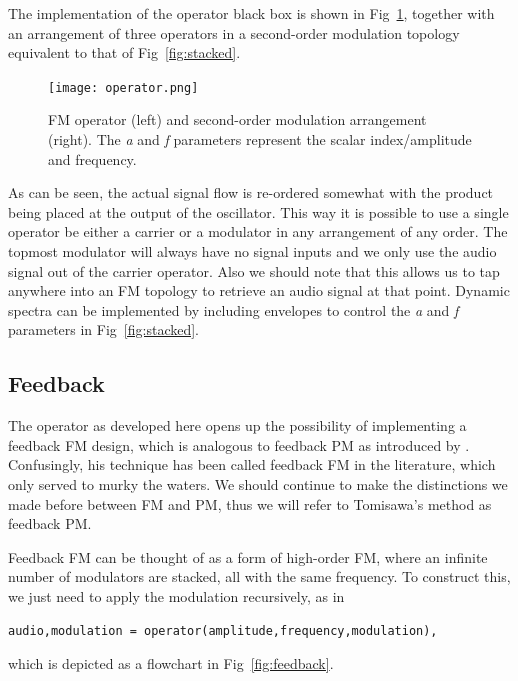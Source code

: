 \documentclass[]{interact}
\begin{document}
The implementation of the operator black box is shown in Fig~\ref{fig:operator}, together with
an arrangement of three operators in a second-order modulation topology equivalent to that
of Fig~\ref{fig:stacked}. 

\begin{figure}[htp]
\begin{center}
\texttt{[image: operator.png]}
\caption{FM operator (left) and second-order modulation arrangement (right). The \emph{a} and \emph{f}
parameters represent the scalar index/amplitude and frequency.}
\label{fig:operator}
\end{center}
\end{figure} 

As can be seen, the actual signal flow is re-ordered somewhat with the
product being placed at the output of the oscillator. This way it is possible to use a single operator
be either a carrier or a modulator in any arrangement of any order. The topmost modulator will
always have no signal inputs and we only use the audio signal out of the carrier operator. Also
we should note that this allows us to tap anywhere into an FM topology to retrieve an audio
signal at that point. Dynamic spectra can be implemented by including envelopes to control
the \emph{a} and \emph{f} parameters in Fig~\ref{fig:stacked}.

\subsection{Feedback}

The operator as developed here opens up the possibility of implementing a feedback FM design, which 
is analogous to feedback PM as introduced by \cite{Tomisawa}. Confusingly, his technique 
has been called feedback FM in the literature, which only served to murky the waters. We should
continue to make the distinctions we made before between FM and PM, thus we will refer to Tomisawa's
method as feedback PM.

Feedback FM can be thought of as a form of high-order FM, where an infinite number of modulators are stacked, all with the same frequency. To construct this, we just need to apply the modulation recursively, as in

\begin{lstlisting}
audio,modulation = operator(amplitude,frequency,modulation),
\end{lstlisting}

\noindent which is depicted as a flowchart in Fig~\ref{fig:feedback}.
\end{document}
